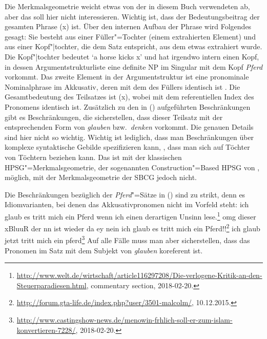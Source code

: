 \z
Die Merkmalsgeometrie weicht etwas von der in diesem Buch verwendeten ab, aber das
soll hier nicht interessieren. Wichtig ist, dass der Bedeutungsbeitrag der gesamten
Phrase (x) ist. Über den internen Aufbau der Phrase wird Folgendes
gesagt: Sie besteht aus einer Füller"=Tochter (einem extrahierten Element) und aus einer
Kopf"|tochter, die dem Satz entspricht, aus dem etwas extrahiert wurde. Die Kopf"|tochter bedeutet
`\textrm{a horse kicks x}' und hat irgendwo intern einen Kopf, in dessen Argumentstrukturliste eine definite
NP im Singular mit dem Kopf \emph{Pferd} vorkommt. Das zweite Element in der
Argumentstruktur ist eine pronominale Nominalphrase im Akkusativ, deren \localw mit dem des Füllers
identisch ist . Die Gesamtbedeutung des Teilsatzes ist (x),
wobei  mit dem referentiellen Index des Pronomens identisch ist. Zusätzlich zu den in
() aufgeführten Beschränkungen gibt es Beschränkungen, die sicherstellen, dass dieser
Teilsatz mit der entsprechenden Form von \emph{glauben} bzw.\ \emph{denken} vorkommt. Die genauen
Details sind hier nicht so wichtig. Wichtig ist lediglich, dass man Beschränkungen über komplexe
syntaktische Gebilde spezifizieren kann, \dash, dass man sich auf Töchter von Töchtern beziehen
kann. Das ist mit der klassischen HPSG"=Merkmalsgeometrie, der sogenannten Construction"=Based
HPSG von \citet{Sag97a}, möglich, mit der Merkmalsgeometrie der SBCG jedoch nicht.

Die Beschränkungen bezüglich der \emph{Pferd}"=Sätze in () sind zu strikt, denn es
Idiomvarianten, bei denen das Akkusativpronomen nicht im Vorfeld steht:
\eal
\ex 
ich glaub es tritt mich ein Pferd wenn ich einen derartigen Unsinn lese.\footnote{%
  \url{http://www.welt.de/wirtschaft/article116297208/Die-verlogene-Kritik-an-den-Steuerparadiesen.html},
  commentary section, 2018-02-20.
}
\ex omg dieser xBluuR der nn ist wieder da ey nein ich glaub es tritt mich ein Pferd!!\footnote{%
  \url{http://forum.gta-life.de/index.php?user/3501-malcolm/},
  10.12.2015.
}
\ex ich glaub jetzt tritt mich ein pferd\footnote{%
  \url{http://www.castingshow-news.de/menowin-frhlich-soll-er-zum-islam-konvertieren-7228/},
  2018-02-20.
}
\zl
Auf alle Fälle muss man aber sicherstellen, dass das Pronomen im Satz mit dem Subjekt von
\emph{glauben} koreferent ist. 

